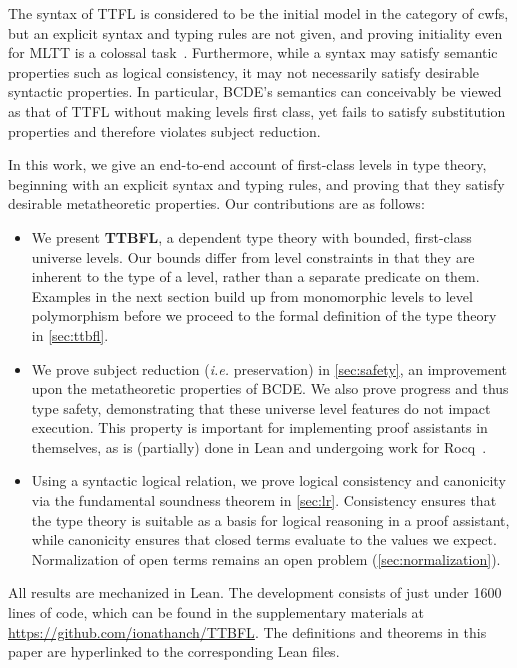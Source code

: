 \documentclass[a4paper,UKenglish,cleveref,autoref,thm-restate]{lipics-v2021}
\makeatletter
\newcommand{\citep}[1]{\cite{#1}}
\newcommand{\repo}{https://github.com/ionathanch/TTBFL}
\newcommand{\lang}{TTBFL\@\xspace}
\newcommand{\ie}{\textit{i.e.}\@\xspace}
\makeatother
\begin{document}
The syntax of TTFL is considered to be the initial model in the category of cwfs,
but an explicit syntax and typing rules are not given,
and proving initiality even for MLTT is a colossal task~\citep{initiality}.
Furthermore, while a syntax may satisfy semantic properties such as logical consistency,
it may not necessarily satisfy desirable syntactic properties.
In particular, BCDE's semantics can conceivably be viewed as
that of TTFL without making levels first class,
yet fails to satisfy substitution properties and therefore violates subject reduction.

In this work, we give an end-to-end account of first-class levels in type theory,
beginning with an explicit syntax and typing rules,
and proving that they satisfy desirable metatheoretic properties.
Our contributions are as follows:

\begin{itemize}[topsep=0pt]
  \item We present \textbf{\lang},
    a dependent type theory with bounded, first-class universe levels.
    Our bounds differ from level constraints in that
    they are inherent to the type of a level,
    rather than a separate predicate on them.
    Examples in the next section build up from monomorphic levels to level polymorphism
    before we proceed to the formal definition of the type theory in \cref{sec:ttbfl}.
  \item We prove subject reduction (\ie preservation) in \cref{sec:safety},
    an improvement upon the metatheoretic properties of BCDE.
    We also prove progress and thus type safety,
    demonstrating that these universe level features do not impact execution.
    This property is important for implementing proof assistants in themselves,
    as is (partially) done in Lean and undergoing work for Rocq~\citep{coq-in-coq}.
  \item Using a syntactic logical relation,
    we prove logical consistency and canonicity
    via the fundamental soundness theorem in \cref{sec:lr}.
    Consistency ensures that the type theory is suitable
    as a basis for logical reasoning in a proof assistant,
    while canonicity ensures that closed terms evaluate to the values we expect.
    Normalization of open terms remains an open problem (\cref{sec:normalization}).
\end{itemize}
%
All results are mechanized in Lean.
The development consists of just under 1600 lines of code,
which can be found in the supplementary materials at \url{\repo}.
The definitions and theorems in this paper
are hyperlinked to the corresponding Lean files.
\end{document}
